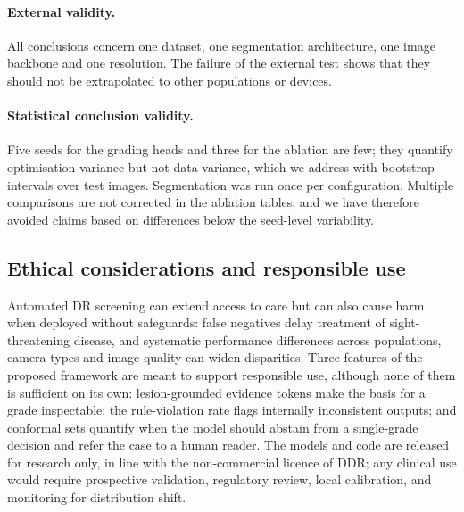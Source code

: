 \paragraph{External validity.} All conclusions concern one dataset, one segmentation architecture, one image backbone and one resolution. The failure of the external test shows that they should not be extrapolated to other populations or devices.

\paragraph{Statistical conclusion validity.} Five seeds for the grading heads and three for the ablation are few; they quantify optimisation variance but not data variance, which we address with bootstrap intervals over test images. Segmentation was run once per configuration. Multiple comparisons are not corrected in the ablation tables, and we have therefore avoided claims based on differences below the seed-level variability.

\subsection{Ethical considerations and responsible use}
Automated DR screening can extend access to care but can also cause harm when deployed without safeguards: false negatives delay treatment of sight-threatening disease, and systematic performance differences across populations, camera types and image quality can widen disparities. Three features of the proposed framework are meant to support responsible use, although none of them is sufficient on its own: lesion-grounded evidence tokens make the basis for a grade inspectable; the rule-violation rate flags internally inconsistent outputs; and conformal sets quantify when the model should abstain from a single-grade decision and refer the case to a human reader. The models and code are released for research only, in line with the non-commercial licence of DDR; any clinical use would require prospective validation, regulatory review, local calibration, and monitoring for distribution shift.

